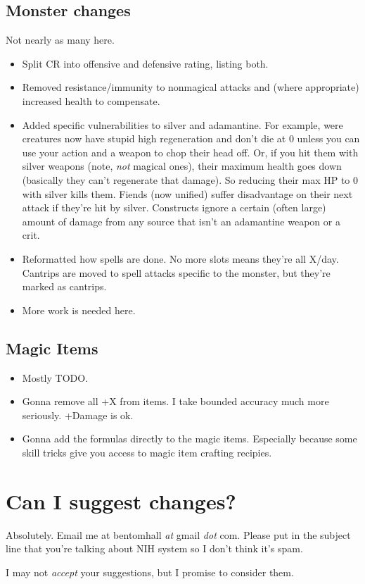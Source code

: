 \subsection*{Monster changes}
Not nearly as many here.
\begin{itemize}
    \item Split CR into offensive and defensive rating, listing both.
    \item Removed resistance/immunity to nonmagical attacks and (where appropriate) increased health to compensate.
    \item Added specific vulnerabilities to silver and adamantine. For example, were creatures now have stupid high regeneration and don't die at 0 unless you can use your action and a weapon to chop their head off. Or, if you hit them with silver weapons (note, \textit{not} magical ones), their maximum health goes down (basically they can't regenerate that damage). So reducing their max HP to 0 with silver kills them. Fiends (now unified) suffer disadvantage on their next attack if they're hit by silver. Constructs ignore a certain (often large) amount of damage from any source that isn't an adamantine weapon or a crit.
    \item Reformatted how spells are done. No more slots means they're all X/day. Cantrips are moved to spell attacks specific to the monster, but they're marked as cantrips.
    \item More work is needed here.
\end{itemize}
\subsection*{Magic Items}
\begin{itemize}
    \item Mostly TODO.
    \item Gonna remove all +X from items. I take bounded accuracy much more seriously. +Damage is ok.
    \item Gonna add the formulas directly to the magic items. Especially because some skill tricks give you access to magic item crafting recipies.
\end{itemize}

\section{Can I suggest changes?}
Absolutely. Email me at bentomhall \textit{at} gmail \textit{dot} com. Please put in the subject line that you're talking about NIH system so I don't think it's spam.

I may not \textit{accept} your suggestions, but I promise to consider them.
